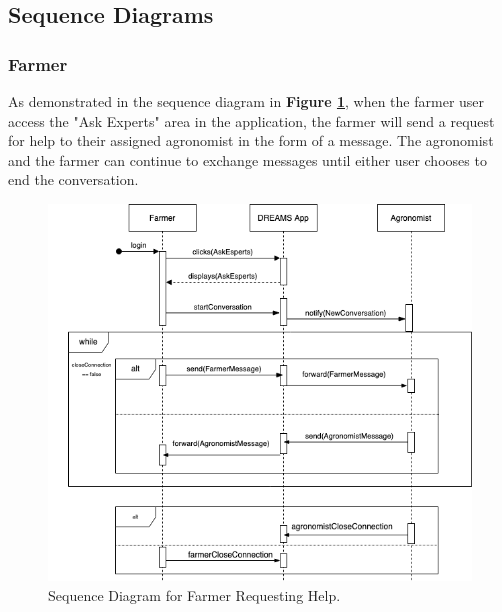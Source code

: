 





\newpage
\subsection{Sequence Diagrams}

\subsubsection{Farmer}

\begin{flushleft}
As demonstrated in the sequence diagram in \textbf{Figure \ref{fig:farmerSeqRequest}}, when the farmer user access the "Ask Experts" area in the application, the farmer will send a request for help to their assigned agronomist in the form of a message. The agronomist and the farmer can continue to exchange messages until either user chooses to end the conversation.
\end{flushleft}

\begin{figure}[hbt!]
\centering
\includegraphics[scale=0.6]{Files/sequence_disgrams/thePNGs/farmer_askExperts.png}
\caption{\label{fig:farmerSeqRequest}Sequence Diagram for Farmer Requesting Help.}
\end{figure}


